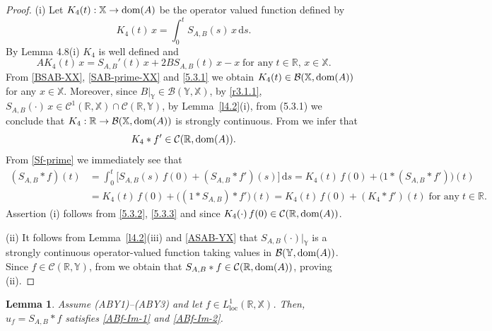 \documentclass[11pt]{amsart}
\numberwithin{equation}{section}
\newcommand{\SAB}{S_{A,B}}
\newcommand{\RR}{{\mathbb R}}
\newcommand{\rmd}{{\mathrm{d}}}
\newtheorem{lemma}[theorem]{Lemma}
\theoremstyle{remark}
\theoremstyle{definition}
\newcommand\bX{{\mathbb X}}
\newcommand\bY{{\mathbb Y}}
\newcommand{\dom}{\text{\rm{dom}}}
\begin{document}
\begin{proof}
	(i)  Let $K_4(t):\bX \to \dom(A)$ be the operator valued function defined by $$K_4(t)\,x = \displaystyle\int_0^t S_{A,B}(s)\,x\,\rmd s.$$ 
	By Lemma 4.8(i) $K_4$ is well defined and
	\begin{equation}\label{5.3.1} 
		AK_4(t)\,x = S_{A,B}'(t)\,x + 2B\SAB(t)\,x - x\;\mbox{for any}\;t\in\RR,\,x\in\bX.
	\end{equation}
	From \eqref{BSAB-XX}, \eqref{SAB-prime-XX} and \eqref{5.3.1} we obtain $K_4(t) \in \mathcal{B}(\bX, \dom(A))$ for any $x \in \bX$. Moreover, since $B|_\bY \in \mathcal{B}(\bY, \bX)$, by \eqref{r3.1.1}, $S_{A,B}(\cdot)\,x \in \mathcal{C}^1(\mathbb{R}, \bX) \cap \mathcal{C}(\mathbb{R}, \bY)$, by Lemma~\ref{l4.2}(i), from (5.3.1) we conclude that $K_4: \mathbb{R} \to \mathcal{B}(\bX, \dom(A))$ is strongly continuous. From \cite[Proposition 1.3.4]{ABHN} we infer that
	\begin{equation}\label{5.3.2} 
		K_4 * f' \in \mathcal{C}(\mathbb{R}, \dom(A)).
	\end{equation}
	From \eqref{Sf-prime} we immediately see that
	\begin{align}\label{5.3.3} 
		(S_{A,B} * f)(t)&= \int_0^t \bigl[S_{A,B}(s)\,f(0) + (S_{A,B} * f')(s)\bigr]\,\rmd s=K_4(t)\,f(0) + \bigl(1 * (S_{A,B} * f')\bigr)(t)\nonumber\\
		&= K_4(t)\,f(0) + \bigl((1 * S_{A,B}) * f'\bigr)(t)
		= K_4(t)\,f(0) + (K_4 * f')(t) \;\text{for any}\; t \in \mathbb{R}.
	\end{align}
	Assertion (i) follows from \eqref{5.3.2}, \eqref{5.3.3} and since $K_4(\cdot)\,f(0) \in \mathcal{C}(\mathbb{R}, \dom(A))$.
	
	(ii) It follows from Lemma~\ref{l4.2}(iii) and \eqref{ASAB-YX} that $S_{A,B}(\cdot)|_\bY$ is a strongly continuous operator-valued function taking values in $\mathcal{B}(\bY, \dom(A))$. Since $f \in \mathcal{C}(\mathbb{R}, \bY)$, from \cite[Proposition 1.3.4]{ABHN} we obtain that $S_{A,B} * f \in \mathcal{C}(\mathbb{R}, \dom(A))$, proving (ii).
\end{proof}
\begin{lemma}\label{l5.4}
	Assume \textnormal{(ABY1)--(ABY3)} and let $f \in L^1_{\mathrm{loc}}(\mathbb{R}, \bX)$.  Then, $u_f=\SAB*f$ satisfies \eqref{ABf-Im-1} and \eqref{ABf-Im-2}.
\end{lemma}
\end{document}
